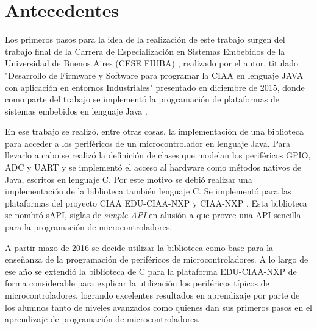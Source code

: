 \section{Antecedentes}
\label{sec:antecedentes}

Los primeros pasos para la idea de la realización de este trabajo surgen del trabajo final de la Carrera de Especialización en Sistemas Embebidos de la Universidad de Buenos Aires (CESE FIUBA) \cite{CESE}, realizado por el autor, titulado "Desarrollo de Firmware y Software para programar la CIAA en lenguaje JAVA con aplicación en entornos Industriales" \cite{CeseTesisEric} presentado en diciembre de 2015, donde como parte del trabajo se implementó la programación de plataformas de sistemas embebidos en lenguaje Java \cite{Java}. 

En ese trabajo se realizó, entre otras cosas, la implementación de una biblioteca para acceder a los periféricos de un microcontrolador en lenguaje Java. Para llevarlo a cabo se realizó la definición de clases que modelan los periféricos GPIO, ADC y UART y se implementó el acceso al hardware como métodos nativos de Java, escritos en lenguaje C. Por este motivo se debió realizar una implementación de la biblioteca también lenguaje C. 
Se implementó para las plataformas del proyecto CIAA EDU-CIAA-NXP \cite{EDUCIAA} y CIAA-NXP \cite{CIAANXP}.
Esta biblioteca se nombró sAPI, siglas de \emph{simple API} en alusión a que provee una API sencilla para la programación de microcontroladores.


A partir mazo de 2016 se decide utilizar la biblioteca como base para la enseñanza de la programación de periféricos de microcontroladores.
A lo largo de ese año se extendió la biblioteca de C para la plataforma EDU-CIAA-NXP de forma considerable para explicar la utilización los periféricos típicos de microcontroladores, logrando excelentes resultados en aprendizaje por parte de los alumnos tanto de niveles avanzados como quienes dan sus primeros pasos en el aprendizaje de programación de microcontroladores.

